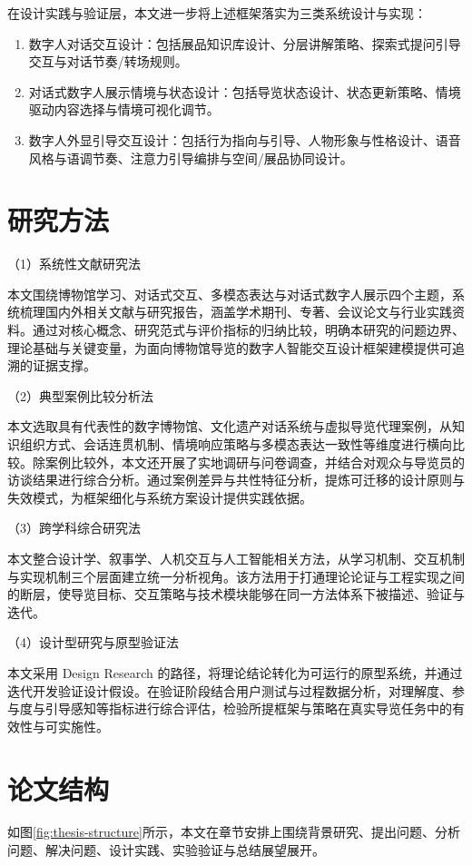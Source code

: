 在设计实践与验证层，本文进一步将上述框架落实为三类系统设计与实现：
\begin{enumerate}[label=（\arabic*）]
\item 数字人对话交互设计：包括展品知识库设计、分层讲解策略、探索式提问引导交互与对话节奏/转场规则。
\item 对话式数字人展示情境与状态设计：包括导览状态设计、状态更新策略、情境驱动内容选择与情境可视化调节。
\item 数字人外显引导交互设计：包括行为指向与引导、人物形象与性格设计、语音风格与语调节奏、注意力引导编排与空间/展品协同设计。
\end{enumerate}

\section{研究方法}
（1）系统性文献研究法

本文围绕博物馆学习、对话式交互、多模态表达与对话式数字人展示四个主题，系统梳理国内外相关文献与研究报告，涵盖学术期刊、专著、会议论文与行业实践资料。通过对核心概念、研究范式与评价指标的归纳比较，明确本研究的问题边界、理论基础与关键变量，为面向博物馆导览的数字人智能交互设计框架建模提供可追溯的证据支撑。

（2）典型案例比较分析法

本文选取具有代表性的数字博物馆、文化遗产对话系统与虚拟导览代理案例，从知识组织方式、会话连贯机制、情境响应策略与多模态表达一致性等维度进行横向比较。除案例比较外，本文还开展了实地调研与问卷调查，并结合对观众与导览员的访谈结果进行综合分析。通过案例差异与共性特征分析，提炼可迁移的设计原则与失效模式，为框架细化与系统方案设计提供实践依据。

（3）跨学科综合研究法

本文整合设计学、叙事学、人机交互与人工智能相关方法，从学习机制、交互机制与实现机制三个层面建立统一分析视角。该方法用于打通理论论证与工程实现之间的断层，使导览目标、交互策略与技术模块能够在同一方法体系下被描述、验证与迭代。

（4）设计型研究与原型验证法

本文采用 Design Research 的路径，将理论结论转化为可运行的原型系统，并通过迭代开发验证设计假设。在验证阶段结合用户测试与过程数据分析，对理解度、参与度与引导感知等指标进行综合评估，检验所提框架与策略在真实导览任务中的有效性与可实施性。

\section{论文结构}
如图\ref{fig:thesis-structure}所示，本文在章节安排上围绕背景研究、提出问题、分析问题、解决问题、设计实践、实验验证与总结展望展开。

